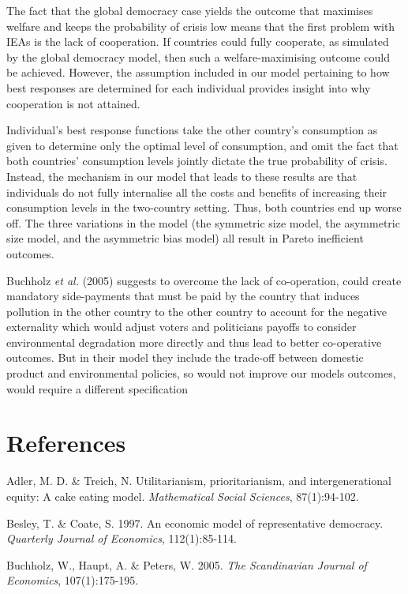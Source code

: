 \documentclass[11pt,preprint, authoryear]{elsarticle}
\numberwithin{equation}{section}
\numberwithin{figure}{section}
\numberwithin{table}{section}
\begin{document}
The fact that the global democracy case yields the outcome that
maximises welfare and keeps the probability of crisis low means that the
first problem with IEAs is the lack of cooperation. If countries could
fully cooperate, as simulated by the global democracy model, then such a
welfare-maximising outcome could be achieved. However, the assumption
included in our model pertaining to how best responses are determined
for each individual provides insight into why cooperation is not
attained.

Individual's best response functions take the other country's
consumption as given to determine only the optimal level of consumption,
and omit the fact that both countries' consumption levels jointly
dictate the true probability of crisis. Instead, the mechanism in our
model that leads to these results are that individuals do not fully
internalise all the costs and benefits of increasing their consumption
levels in the two-country setting. Thus, both countries end up worse
off. The three variations in the model (the symmetric size model, the
asymmetric size model, and the asymmetric bias model) all result in
Pareto inefficient outcomes.

Buchholz \emph{et al.} (2005) suggests to overcome the lack of
co-operation, could create mandatory side-payments that must be paid by
the country that induces pollution in the other country to the other
country to account for the negative externality which would adjust
voters and politicians payoffs to consider environmental degradation
more directly and thus lead to better co-operative outcomes. But in
their model they include the trade-off between domestic product and
environmental policies, so would not improve our models outcomes, would
require a different specification

\newpage

\hypertarget{references}{%
\section*{References}\label{references}}

Adler, M. D. \& Treich, N. Utilitarianism, prioritarianism, and
intergenerational equity: A cake eating model. \emph{Mathematical Social
Sciences}, 87(1):94-102.

Besley, T. \& Coate, S. 1997. An economic model of representative
democracy. \emph{Quarterly Journal of Economics}, 112(1):85-114.

Buchholz, W., Haupt, A. \& Peters, W. 2005. \emph{The Scandinavian
Journal of Economics}, 107(1):175-195.
\end{document}
